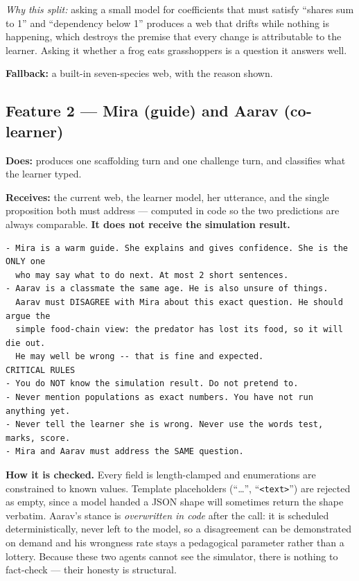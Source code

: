 \documentclass[11pt,a4paper]{article}
\begin{document}
\textit{Why this split:} asking a small model for coefficients that must satisfy ``shares sum to
1'' and ``dependency below 1'' produces a web that drifts while nothing is happening, which
destroys the premise that every change is attributable to the learner. Asking it whether a frog
eats grasshoppers is a question it answers well.

\textbf{Fallback:} a built-in seven-species web, with the reason shown.

\subsection*{Feature 2 --- Mira (guide) and Aarav (co-learner)}

\textbf{Does:} produces one scaffolding turn and one challenge turn, and classifies what the
learner typed.

\textbf{Receives:} the current web, the learner model, her utterance, and the single proposition
both must address --- computed in code so the two predictions are always comparable.
\textbf{It does not receive the simulation result.}

\begin{lstlisting}
- Mira is a warm guide. She explains and gives confidence. She is the ONLY one
  who may say what to do next. At most 2 short sentences.
- Aarav is a classmate the same age. He is also unsure of things.
  Aarav must DISAGREE with Mira about this exact question. He should argue the
  simple food-chain view: the predator has lost its food, so it will die out.
  He may well be wrong -- that is fine and expected.
CRITICAL RULES
- You do NOT know the simulation result. Do not pretend to.
- Never mention populations as exact numbers. You have not run anything yet.
- Never tell the learner she is wrong. Never use the words test, marks, score.
- Mira and Aarav must address the SAME question.
\end{lstlisting}

\textbf{How it is checked.} Every field is length-clamped and enumerations are constrained to
known values. Template placeholders (``\ldots'', ``\texttt{<text>}'') are rejected as empty, since
a model handed a JSON shape will sometimes return the shape verbatim. Aarav's stance is
\emph{overwritten in code} after the call: it is scheduled deterministically, never left to the
model, so a disagreement can be demonstrated on demand and his wrongness rate stays a
pedagogical parameter rather than a lottery. Because these two agents cannot see the simulator,
there is nothing to fact-check --- their honesty is structural.
\end{document}
